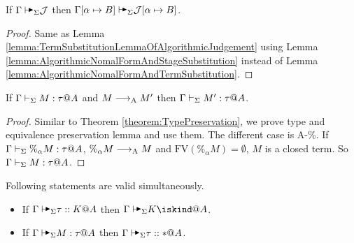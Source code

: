 \begin{lemma}
    \label{lemma:StageSubstitutionLemmaofAlgorithmicJudgement}
    If $\G \AVS \mathcal{J}$ then $\G[\alpha \mapsto B] \AVS \mathcal{J}[\alpha \mapsto B]$.
\end{lemma}

\begin{proof}
    Same as Lemma \ref{lemma:TermSubstitutionLemmaOfAlgorithmicJudgement} using
    Lemma \ref{lemma:AlgorithmicNomalFormAndStageSubstitution} instead of Lemma
    \ref{lemma:AlgorithmicNomalFormAndTermSubstitution}.
\end{proof}

\begin{lemma}
    \label{lemma:TypePreservationofAlgorithmicReduction}
    If \( \Gamma \vdash_\Sigma M:\tau @A \) and \( M \longrightarrow_{\text{A}} M' \) then \( \Gamma \vdash_\Sigma M' : \tau @ A \).
\end{lemma}


\begin{proof}
    Similar to Theorem \ref{theorem:TypePreservation}, we prove type and
    equivalence preservation lemma and use them. The different case is
    \textsc{A-\%}.  If \( \Gamma \vdash_\Sigma \%_\alpha M : \tau @ A \), \( \%_\alpha M \longrightarrow_{\text{A}} M
    \) and \( \text{FV}(\%_\alpha M) = \emptyset \), \( M \) is a closed term.
    So \( \Gamma \vdash_\Sigma M : \tau @ A \).
\end{proof}

%

\begin{lemma}
    Following statements are valid simultaneously.
    \label{lemma:AgreementofAlgorithmicTyping}
    \begin{itemize}
        \item If \( \G \AVS \tau :: K @ A \) then \( \G \AVS K \iskind@ A \).
        \item If \( \G \AVS M : \tau @ A \) then \( \G \AVS \tau :: * @ A \).
    \end{itemize}
\end{lemma}

